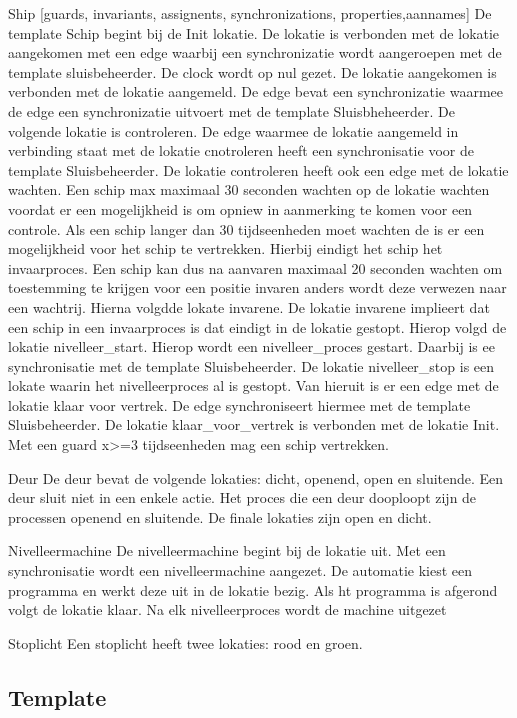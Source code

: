 Ship [guards, invariants, assignents, synchronizations, properties,aannames]
De template Schip begint bij de Init lokatie. De lokatie is verbonden met de lokatie aangekomen met een edge waarbij een synchronizatie wordt aangeroepen met de template sluisbeheerder. De clock wordt op nul gezet. De lokatie aangekomen is verbonden met de lokatie aangemeld. De edge bevat een synchronizatie waarmee de edge een synchronizatie uitvoert met de template Sluisbheheerder.
De volgende lokatie is  controleren. De edge waarmee de lokatie aangemeld in verbinding staat met de lokatie cnotroleren heeft een synchronisatie voor de template Sluisbeheerder. De lokatie controleren heeft ook een edge met de lokatie wachten. Een schip max maximaal 30 seconden wachten op de lokatie wachten voordat er een mogelijkheid is om opniew in aanmerking te komen voor een controle. Als een schip langer dan 30 tijdseenheden moet wachten de is er een mogelijkheid voor het schip te vertrekken. Hierbij eindigt het schip het invaarproces. Een schip kan dus na aanvaren maximaal 20 seconden wachten om toestemming te krijgen voor een positie invaren anders wordt deze verwezen naar een wachtrij.
Hierna volgdde lokate invarene. De lokatie invarene implieert dat een schip in een invaarproces is dat eindigt in de lokatie gestopt.
Hierop volgd de lokatie nivelleer_start. Hierop wordt een nivelleer_proces gestart. Daarbij is ee synchronisatie met de template Sluisbeheerder.
De lokatie nivelleer_stop is een lokate waarin het nivelleerproces al is gestopt. Van hieruit is er een edge met de lokatie klaar voor vertrek. De edge synchroniseert hiermee met de template Sluisbeheerder.
De lokatie klaar_voor_vertrek is verbonden met de lokatie Init. Met een guard x>=3 tijdseenheden mag een schip vertrekken.


Deur
De deur bevat de volgende lokaties: dicht, openend, open en sluitende.
Een deur sluit niet in een enkele actie. Het proces die een deur dooploopt zijn de processen openend en sluitende. De finale lokaties zijn open en dicht.

Nivelleermachine
De nivelleermachine begint bij de lokatie uit. Met een synchronisatie wordt een nivelleermachine aangezet. De automatie kiest een programma en werkt deze uit in de lokatie bezig. Als ht programma is afgerond volgt de lokatie klaar. Na elk nivelleerproces wordt de machine uitgezet

Stoplicht
Een stoplicht heeft twee lokaties: rood en groen.


\subsection{Template}



